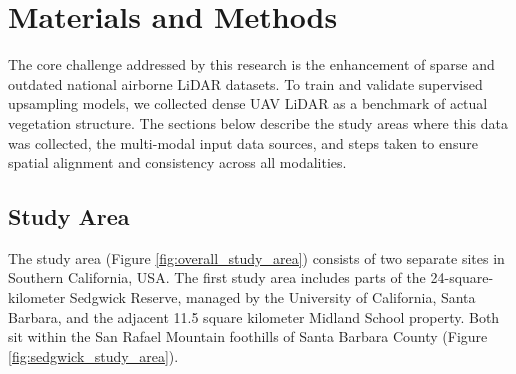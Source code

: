 \documentclass[remotesensing,article,submit,pdftex,moreauthors]{Definitions/mdpi}
\begin{document}
\section{Materials and Methods}



The core challenge addressed by this research is the enhancement of sparse and outdated national airborne LiDAR datasets. To train and validate supervised upsampling models, we collected dense UAV LiDAR as a benchmark of actual vegetation structure. The sections below describe the study areas where this data was collected, the multi-modal input data sources, and steps taken to ensure spatial alignment and consistency across all modalities.


\subsection{Study Area}


The study area (Figure \ref{fig:overall_study_area}) consists of two separate sites in Southern California, USA.
The first study area includes parts of the 24-square-kilometer Sedgwick Reserve, managed by the University of California, Santa Barbara, and the adjacent 11.5 square kilometer Midland School property. Both sit within the San Rafael Mountain foothills of Santa Barbara County (Figure \ref{fig:sedgwick_study_area}).
\end{document}
